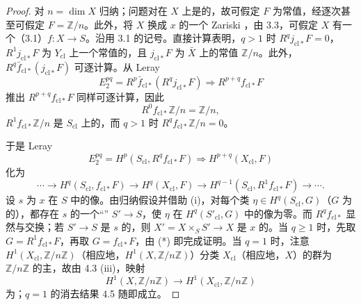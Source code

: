\begin{proof}
对 $n=\dim X$ 归纳；问题对在 $X$ 上是的，故可假定 $F$ 为常值，经逐次甚至可假定 $F=\mathbb Z/n$。此外，将 $X$ 换成 $x$ 的一个 Zariski ，由 3.3，可假定 $X$ 有一个（3.1）$f:X\to S$。沿用 3.1 的记号。直接计算表明，$q>1$ 时 $R^qj_{\mathrm{cl}*}F=0$，$R^1j_{\mathrm{cl}*}F$ 为 $Y_{\mathrm{cl}}$ 上一个常值的，且 $j_{\mathrm{cl}*}F$ 为 $\bar X$ 上的常值 $\mathbb Z/n$。此外，$R^q\bar f_{\mathrm{cl}*}(j_{\mathrm{cl}*}F)$ 可逐计算。从 Leray 
\[
 E_2^{pq}=R^p\bar f_{\mathrm{cl}*}(R^qj_{\mathrm{cl}*}F)
 \Longrightarrow R^{p+q}f_{\mathrm{cl}*}F
\]
推出 $R^{p+q}f_{\mathrm{cl}*}F$ 同样可逐计算，因此
\[
 R^0f_{\mathrm{cl}*}\mathbb Z/n=\mathbb Z/n,
\]
$R^1f_{\mathrm{cl}*}\mathbb Z/n$ 是 $S_{\mathrm{cl}}$ 上的，而 $q>1$ 时 $R^qf_{\mathrm{cl}*}\mathbb Z/n=0$。

于是 Leray 
\[
 E_2^{pq}=H^p(S_{\mathrm{cl}},R^qf_{\mathrm{cl}*}F)
 \Longrightarrow H^{p+q}(X_{\mathrm{cl}},F)
\]
化为
\begin{equation}
 \cdots\longrightarrow H^q(S_{\mathrm{cl}},f_{\mathrm{cl}*}F)
 \longrightarrow H^q(X_{\mathrm{cl}},F)
 \longrightarrow H^{q-1}(S_{\mathrm{cl}},R^1f_{\mathrm{cl}*}F)\longrightarrow\cdots.\tag{*}
\end{equation}
设 $s$ 为 $x$ 在 $S$ 中的像。由归纳假设并借助 (i)，对每个类 $\eta\in H^q(S_{\mathrm{cl}},G)$（$G$ 为的），都存在 $s$ 的一个“” $S'\to S$，使 $\eta$ 在 $H^q(S'_{\mathrm{cl}},G)$ 中的像为零。而 $R^qf_{\mathrm{cl}*}$ 显然与交换；若 $S'\to S$ 是 $s$ 的，则 $X'=X\times_SS'\to X$ 是 $x$ 的。当 $q\geq1$ 时，先取 $G=R^1f_{\mathrm{cl}*}F$，再取 $G=f_{\mathrm{cl}*}F$，由 (*) 即完成证明。当 $q=1$ 时，注意 $H^1(X_{\mathrm{cl}},\mathbb Z/n\mathbb Z)$（相应地，$H^1(X,\mathbb Z/n\mathbb Z)$）分类 $X_{\mathrm{cl}}$（相应地，$X$）的群为 $\mathbb Z/n\mathbb Z$ 的主，故由 4.3 (iii)，映射
\[
 H^1(X,\mathbb Z/n\mathbb Z)\longrightarrow H^1(X_{\mathrm{cl}},\mathbb Z/n\mathbb Z)
\]
为；$q=1$ 的消去结果 4.5 随即成立。
\end{proof}

